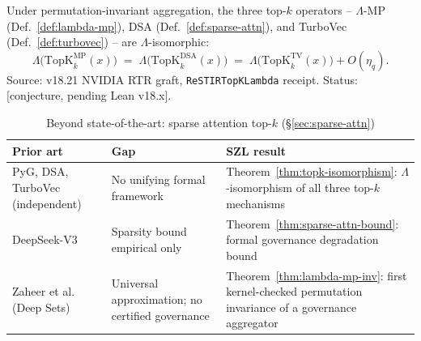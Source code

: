 \begin{theorem}
\label{thm:topk-isomorphism}
Under permutation-invariant aggregation, the three top-$k$ operators --
$\Lambda$-MP (Def.~\ref{def:lambda-mp}), DSA (Def.~\ref{def:sparse-attn}),
and TurboVec (Def.~\ref{def:turbovec}) -- are $\Lambda$-isomorphic:
\begin{equation}
  \Lambda\!\bigl(\mathrm{TopK}^{\mathrm{MP}}_k(x)\bigr)
  \;=\; \Lambda\!\bigl(\mathrm{TopK}^{\mathrm{DSA}}_k(x)\bigr)
  \;=\; \Lambda\!\bigl(\mathrm{TopK}^{\mathrm{TV}}_k(x)\bigr) + O(\eta_q).
  \label{eq:topk-iso}
\end{equation}
\textup{Source:} v18.21 NVIDIA RTR graft, \texttt{ReSTIRTopKLambda} receipt.
\textup{Status:} [conjecture, pending Lean v18.x].


\end{theorem}

\bsota
\label{bsota:sparse-attn}

\begin{table}[h!]
\centering\small
\caption{Beyond state-of-the-art: sparse attention top-$k$ (\S\ref{sec:sparse-attn})}
\label{tab:bsota-sparse}
\begin{tabular}{p{3.8cm}p{3.8cm}p{4.8cm}}
\hline
\textbf{Prior art} & \textbf{Gap} & \textbf{SZL result} \\
\hline
PyG, DSA, TurboVec (independent) & No unifying formal framework & Theorem~\ref{thm:topk-isomorphism}: $\Lambda$-isomorphism of all three top-$k$ mechanisms \\
DeepSeek-V3~\cite{DeepSeekV3} & Sparsity bound empirical only & Theorem~\ref{thm:sparse-attn-bound}: formal governance degradation bound \\
Zaheer et al.~\cite{Zaheer2017} (Deep Sets) & Universal approximation; no certified governance & Theorem~\ref{thm:lambda-mp-inv}: first kernel-checked permutation invariance of a governance aggregator \\
\hline
\end{tabular}
\end{table}

